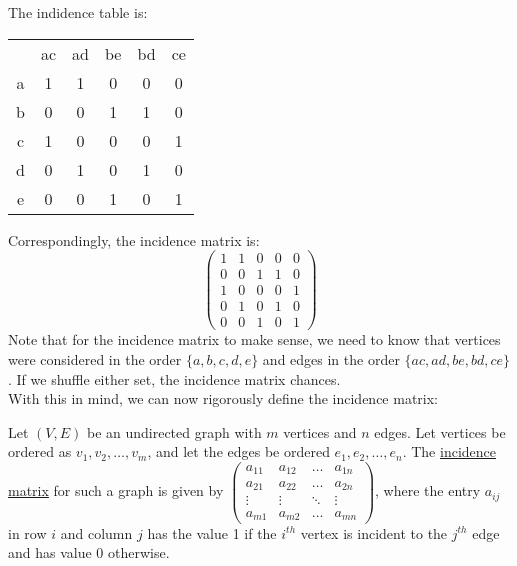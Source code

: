 \documentclass[10pt]{article}
\begin{document}
\begin{description}
\begin{figure}[h!]
		\end{figure}
		\item The indidence table is:
		\begin{table}[h!]
			\centering
			\begin{tabular}{c|ccccc}
				& ac & ad & be & bd & ce \\ \cline{1-6}
				a & 1 & 1 & 0 & 0 & 0 \\
				b & 0 & 0 & 1 & 1 & 0 \\
				c & 1 & 0 & 0 & 0 & 1 \\
				d & 0 & 1 & 0 & 1 & 0 \\
				e & 0 & 0 & 1 & 0 & 1 \\
			\end{tabular}
		\end{table}
		\item Correspondingly, the incidence matrix is:
		\[ \left( \begin{array}{ccccc}
		1 & 1 & 0 & 0 & 0 \\
		0 & 0 & 1 & 1 & 0 \\
		1 & 0 & 0 & 0 & 1 \\
		0 & 1 & 0 & 1 & 0 \\
		0 & 0 & 1 & 0 & 1 \end{array} \right)\] 
		Note that for the incidence matrix to make sense, we need to know that vertices were considered in the order $\{a, b, c, d, e\}$ and edges in the order $\{ac, ad, be, bd, ce\}$. If we shuffle either set, the incidence matrix chances. \\
		With this in mind, we can now rigorously define the incidence matrix:
		\item[Definition:] Let $(V, E)$ be an undirected graph with $m$ vertices and $n$ edges. Let vertices be ordered as $v_1, v_2,\dots, v_m$, and let the edges be ordered $e_1, e_2, \dots, e_n$. The \underline{incidence matrix} for such a graph is given by $\left( \begin{array}{cccc}
			a_{11} & a_{12} & \dots & a_{1n} \\
			a_{21} & a_{22} & \dots & a_{2n} \\
			\vdots & \vdots & \ddots & \vdots \\
			a_{m1} & a_{m2} & \dots & a_{mn} \end{array} \right)$, where the entry $a_{ij}$ in row $i$ and column $j$ has the value 1 if the $i^{th}$ vertex is incident to the $j^{th}$ edge and has value 0 otherwise. \\

\end{description}
\end{document}
